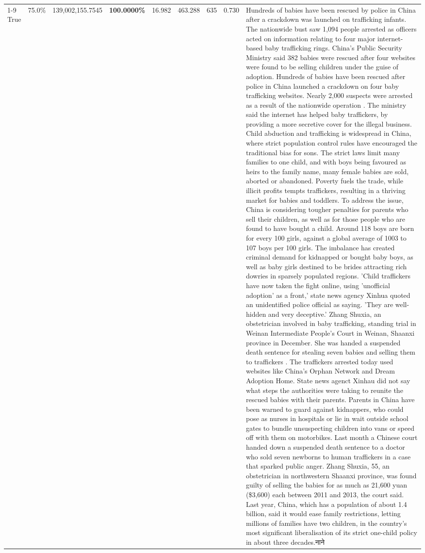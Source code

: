 \begin{table}[H]
\begin{tabular}{lllrlllll}
\cline{1-9}
True & 75.0\% & 139,002,155.7545 & \bfseries \color{red} 100.0000\% & 16.982 & 463.288 & 635 & 0.730 & Hundreds of babies have been rescued by police in China after a crackdown was launched on trafficking infants. The nationwide bust saw 1,094 people arrested as officers acted on information relating to four major internet-based baby trafficking rings. China's Public Security Ministry said 382 babies were rescued after four websites were found to be selling children under the guise of adoption. Hundreds of babies have been rescued after police in China launched a crackdown on four baby trafficking websites. Nearly 2,000 suspects were arrested as a result of the nationwide operation . The ministry said the internet has helped baby traffickers, by providing a more secretive cover for the illegal business. Child abduction and trafficking is widespread in China, where strict population control rules have encouraged the traditional bias for sons. The strict laws limit many families to one child, and with boys being favoured as heirs to the family name, many female babies are sold, aborted or abandoned. Poverty fuels the trade, while illicit profits tempts traffickers, resulting in a thriving market for babies and toddlers. To address the issue, China is considering tougher penalties for parents who sell their children, as well as for those people who are found to have bought a child. Around 118 boys are born for every 100 girls, against a global average of 1003 to 107 boys per 100 girls. The imbalance has created criminal demand for kidnapped or bought baby boys, as well as baby girls destined to be brides attracting rich dowries in sparsely populated regions. 'Child traffickers have now taken the fight online, using 'unofficial adoption' as a front,' state news agency Xinhua quoted an unidentified police official as saying. 'They are well-hidden and very deceptive.' Zhang Shuxia, an obstetrician involved in baby trafficking, standing trial in Weinan Intermediate People's Court in Weinan, Shaanxi province in December. She was handed a suspended death sentence for stealing seven babies and selling them to traffickers . The traffickers arrested today used websites like China's Orphan Network and Dream Adoption Home. State news agenct Xinhau did not say what steps the authorities were taking to reunite the rescued babies with their parents. Parents in China have been warned to guard against kidnappers, who could pose as nurses in hospitals or lie in wait outside school gates to bundle unsuspecting children into vans or speed off with them on motorbikes. Last month a Chinese court handed down a suspended death sentence to a doctor who sold seven newborns to human traffickers in a case that sparked public anger. Zhang Shuxia, 55, an obstetrician in northwestern Shaanxi province, was found guilty of selling the babies for as much as 21,600 yuan (\$3,600) each between 2011 and 2013, the court said. Last year, China, which has a population of about 1.4 billion, said it would ease family restrictions, letting millions of families have two children, in the country's most significant liberalisation of its strict one-child policy in about three decades.नाने \\

\end{tabular}
\end{table}
